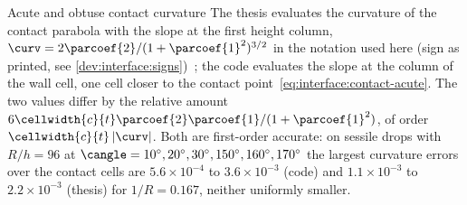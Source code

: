 \begin{deviation}{Acute and obtuse contact curvature}\label{dev:interface:contact-acute}
The thesis evaluates the curvature of the contact parabola with the slope at the
first height column, $\curv=2\parcoef{2}/(1+\parcoef{1}^2)^{3/2}$ in the notation
used here (sign as printed, see \cref{dev:interface:signs})~;
the code evaluates the slope at the column of the wall cell, one cell closer to the
contact point~\cref{eq:interface:contact-acute}. The two values differ by the
relative amount $6\cellwidth{c}{t}\parcoef{2}\parcoef{1}/(1+\parcoef{1}^2)$, of
order $\cellwidth{c}{t}\abs{\curv}$. Both are first-order accurate: on
sessile drops with $R/h=96$ at $\cangle=10^\circ,20^\circ,30^\circ,150^\circ,160^\circ,170^\circ$ the largest
curvature errors over the contact cells are $5.6\times10^{-4}$ to $3.6\times10^{-3}$ (code) and
$1.1\times10^{-3}$ to $2.2\times10^{-3}$ (thesis) for $1/R=0.167$, neither
uniformly smaller.
\end{deviation}

